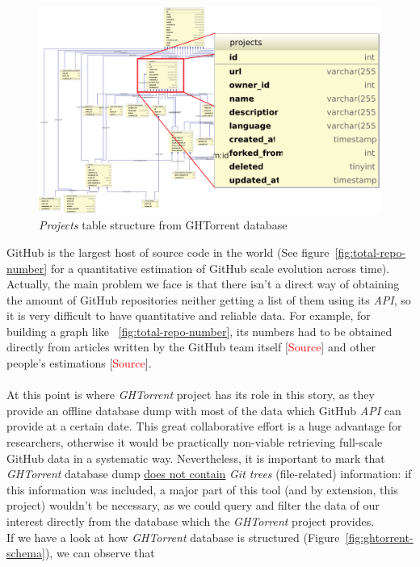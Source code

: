 \documentclass[a4paper, 12pt]{book}
\begin{document}
\begin{figure}
  \centering
  \includegraphics[width=16cm, keepaspectratio]{img/ghtorrent-schema-detail}
  \caption{\textit{Projects} table structure from GHTorrent database}
  \label{fig:ghtorrent-schema-detail}
\end{figure}
GitHub is the largest host of source code in the world (See figure~\ref{fig:total-repo-number} for a quantitative
estimation of GitHub scale evolution across time). Actually, the main problem we face is that there isn't a direct way
of obtaining the amount of GitHub repositories neither getting a list of them using its \textit{API}, so it is
very difficult to have quantitative and reliable data. For example, for building a graph like ~\ref{fig:total-repo-number},
its numbers had to be obtained directly from articles written by the GitHub team itself [\textcolor{red}{Source}]
and other people's estimations [\textcolor{red}{Source}].\\\\
At this point is where \emph{GHTorrent} project has its role in this story, as they provide an offline database dump with most
of the data which GitHub \textit{API} can provide at a certain date. This great collaborative effort is a huge advantage
for researchers, otherwise it would be practically non-viable retrieving full-scale GitHub data in a systematic way.
Nevertheless, it is important to mark that \emph{GHTorrent} database dump \underline{does not contain} \textit{Git trees}
(file-related) information: if this information was included, a major part of this tool (and by extension, this project) wouldn't
be necessary, as we could query and filter the data of our interest directly from the database which the \emph{GHTorrent} project provides.\\
If we have a look at how \emph{GHTorrent} database is structured (Figure~\ref{fig:ghtorrent-schema}), we can observe that
\end{document}
